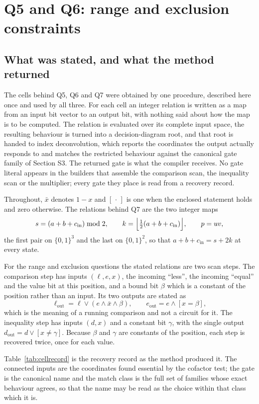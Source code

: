 \documentclass[11pt,a4paper]{article}
\begin{document}
\section{Q5 and Q6: range and exclusion constraints}
\subsection{What was stated, and what the method returned}
\label{sec:cells}
The cells behind Q5, Q6 and Q7 were obtained by one procedure, described here
once and used by all three. For each cell an integer relation is written as a
map from an input bit vector to an output bit, with nothing said about how the
map is to be computed. The relation is evaluated over its complete input space,
the resulting behaviour is turned into a decision-diagram root, and that root is
handed to index deconvolution, which reports the coordinates the output
actually responds to and matches the restricted behaviour against the canonical
gate family of Section S3. The returned gate is what the compiler receives. No
gate literal appears in the builders that assemble the comparison scan, the
inequality scan or the multiplier; every gate they place is read from a
recovery record.

Throughout, $\bar x$ denotes $1-x$ and $[\,\cdot\,]$ is one when the enclosed
statement holds and zero otherwise. The relations behind Q7 are the two integer
maps
\[
 s=(a+b+c_{\mathrm{in}})\bmod 2,\qquad
 k=\Bigl\lfloor\tfrac{1}{2}(a+b+c_{\mathrm{in}})\Bigr\rfloor,\qquad
 p=uv,
\]
the first pair on $\{0,1\}^3$ and the last on $\{0,1\}^2$, so that
$a+b+c_{\mathrm{in}}=s+2k$ at every state.

For the range and exclusion questions the stated relations are two scan steps.
The comparison step has inputs $(\ell,e,x)$, the incoming ``less'', the incoming
``equal'' and the value bit at this position, and a bound bit $\beta$ which is a
constant of the position rather than an input. Its two outputs are stated as
\[
 \ell_{\mathrm{out}}=\ell\vee(e\wedge\bar x\wedge\beta),\qquad
 e_{\mathrm{out}}=e\wedge[x=\beta],
\]
which is the meaning of a running comparison and not a circuit for it. The
inequality step has inputs $(d,x)$ and a constant bit $\gamma$, with the single
output $d_{\mathrm{out}}=d\vee[x\ne\gamma]$. Because $\beta$ and $\gamma$ are
constants of the position, each step is recovered twice, once for each value.

Table~\ref{tab:cellrecord} is the recovery record as the method produced it.
The connected inputs are the coordinates found essential by the cofactor test;
the gate is the canonical name and the match class is the full set of families
whose exact behaviour agrees, so that the name may be read as the choice within
that class which it is.
\end{document}
